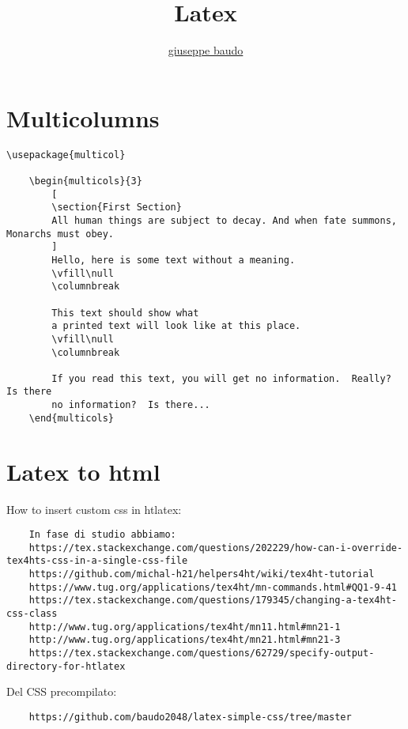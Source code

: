 \documentclass[a4paper,10pt]{article}
\title{Latex}
\author{\href{http://www.baudo.hol.es}{giuseppe baudo}}
\begin{document}
  


\maketitle

\section*{Multicolumns}

\begin{verbatim}
\usepackage{multicol}

	\begin{multicols}{3}
		[
		\section{First Section}
		All human things are subject to decay. And when fate summons, Monarchs must obey.
		]
		Hello, here is some text without a meaning.  
		\vfill\null			
		\columnbreak
		
		This text should show what 
		a printed text will look like at this place.
		\vfill\null
		\columnbreak		
		
		If you read this text, you will get no information.  Really?  Is there 
		no information?  Is there...
	\end{multicols}
\end{verbatim}

\section*{Latex to html}
How to insert custom css in htlatex: 

\begin{verbatim}
	In fase di studio abbiamo:
	https://tex.stackexchange.com/questions/202229/how-can-i-override-tex4hts-css-in-a-single-css-file
	https://github.com/michal-h21/helpers4ht/wiki/tex4ht-tutorial
	https://www.tug.org/applications/tex4ht/mn-commands.html#QQ1-9-41
	https://tex.stackexchange.com/questions/179345/changing-a-tex4ht-css-class
	http://www.tug.org/applications/tex4ht/mn11.html#mn21-1
	http://www.tug.org/applications/tex4ht/mn21.html#mn21-3	
	https://tex.stackexchange.com/questions/62729/specify-output-directory-for-htlatex
\end{verbatim}

Del CSS precompilato:

\begin{verbatim}
	https://github.com/baudo2048/latex-simple-css/tree/master
\end{verbatim}
\end{document}
